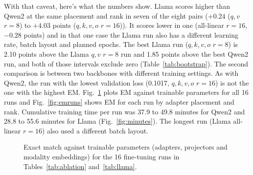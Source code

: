 \documentclass[12pt]{report}
\begin{document}
With that caveat, here's what the numbers show. Llama scores higher than Qwen2 at the same placement and rank in seven of the eight pairs ($+0.24$ ($q,v$ $r=8$) to $+4.03$ points ($q,k,v,o$ $r=16$)). It scores lower in one (all-linear $r=16$, $-0.28$ points) and in that one case the Llama run also has a different learning rate, batch layout and planned epochs. The best Llama run ($q,k,v,o$ $r=8$) is 2.10 points above the Llama $q,v$ $r=8$ run and 1.85 points above the best Qwen2 run, and both of those intervals exclude zero (Table~\ref{tab:bootstrap}). The second comparison is between two backbones with different training settings. As with Qwen2, the run with the lowest validation loss (0.1017, $q,k,v,o$ $r=16$) is not the one with the highest EM. Fig.~\ref{fig:pareto} plots EM against trainable parameters for all 16 runs and Fig.~\ref{fig:emruns} shows EM for each run by adapter placement and rank. Cumulative training time per run was 37.9 to 49.8 minutes for Qwen2 and 28.8 to 55.6 minutes for Llama (Fig.~\ref{fig:minutes}). The longest run (Llama all-linear $r=16$) also used a different batch layout.
\begin{figure}[htbp]
  \centering
  \caption{Exact match against trainable parameters (adapters, projectors and modality embeddings) for the 16 fine-tuning runs in Tables~\ref{tab:ablation} and~\ref{tab:llama}.}
  \label{fig:pareto}
\end{figure}
\end{document}

